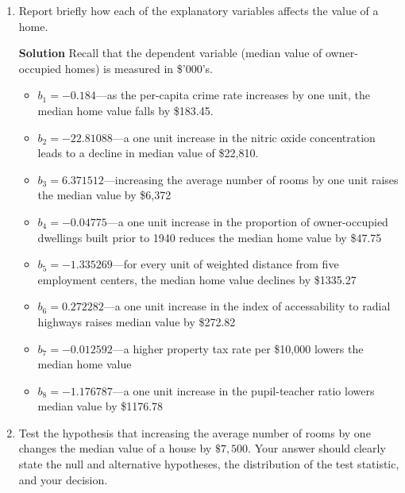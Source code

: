 \documentclass[12pt,a4paper]{article}
\begin{document}
\begin{enumerate}
\item Report briefly how each of the explanatory variables affects
the value of a home. \vspace{0.1in}

\noindent \textbf{Solution} Recall that the dependent variable
(median value of owner-occupied homes) is measured in \$'000's.
\begin{itemize}
\item $b_{1} = -0.184$---as the per-capita crime rate increases by one unit, the median
home value falls by \$183.45.

\item $b_{2} = -22.81088$---a one unit increase in the nitric oxide concentration leads
to a decline in median value of \$22,810.

\item $b_{3} = 6.371512$---increasing the average number of rooms by one unit raises the
median value by \$6,372

\item $b_{4} = -0.04775$---a one unit increase in the proportion of owner-occupied dwellings built prior to 1940 reduces the median home value by \$47.75

\item $b_{5} = -1.335269$---for every unit of weighted distance from five employment centers, the median home value declines by \$1335.27

\item $b_{6} = 0.272282$---a one unit increase in the index of accessability to radial
highways raises median value by \$272.82

\item $b_{7} = -0.012592$---a higher property tax rate per \$10,000 lowers the median home value

\item $b_{8} = -1.176787$---a one unit increase in the pupil-teacher ratio lowers median  value
by \$1176.78
\end{itemize}

\item Test the hypothesis that increasing the average number of rooms by one
changes the median value of a house by $\$7,500$. Your answer should
clearly state the null and alternative hypotheses, the distribution
of the test statistic, and your decision. \vspace{0.1in}


\end{enumerate}
\end{document}
